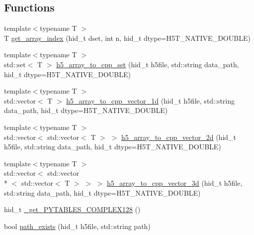 \subsection*{Functions}
\begin{DoxyCompactItemize}
\item 
{\footnotesize template$<$typename T $>$ }\\T \hyperlink{namespaceh5wrap_aa1fe2dffc1fcbde11e7ceaf3fcc57cfd}{get\+\_\+array\+\_\+index} (hid\+\_\+t dset, int n, hid\+\_\+t dtype=H5\+T\+\_\+\+N\+A\+T\+I\+V\+E\+\_\+\+D\+O\+U\+B\+L\+E)
\item 
{\footnotesize template$<$typename T $>$ }\\std\+::set$<$ T $>$ \hyperlink{namespaceh5wrap_ab8c97f180ec4885c15b275a41447912f}{h5\+\_\+array\+\_\+to\+\_\+cpp\+\_\+set} (hid\+\_\+t h5file, std\+::string data\+\_\+path, hid\+\_\+t dtype=H5\+T\+\_\+\+N\+A\+T\+I\+V\+E\+\_\+\+D\+O\+U\+B\+L\+E)
\item 
{\footnotesize template$<$typename T $>$ }\\std\+::vector$<$ T $>$ \hyperlink{namespaceh5wrap_ab927484b5e446d3325d8fc88b00f3e85}{h5\+\_\+array\+\_\+to\+\_\+cpp\+\_\+vector\+\_\+1d} (hid\+\_\+t h5file, std\+::string data\+\_\+path, hid\+\_\+t dtype=H5\+T\+\_\+\+N\+A\+T\+I\+V\+E\+\_\+\+D\+O\+U\+B\+L\+E)
\item 
{\footnotesize template$<$typename T $>$ }\\std\+::vector$<$ std\+::vector$<$ T $>$ $>$ \hyperlink{namespaceh5wrap_a0cc2fdb859631d95b9fe1dd85954f359}{h5\+\_\+array\+\_\+to\+\_\+cpp\+\_\+vector\+\_\+2d} (hid\+\_\+t h5file, std\+::string data\+\_\+path, hid\+\_\+t dtype=H5\+T\+\_\+\+N\+A\+T\+I\+V\+E\+\_\+\+D\+O\+U\+B\+L\+E)
\item 
{\footnotesize template$<$typename T $>$ }\\std\+::vector$<$ std\+::vector\\*
$<$ std\+::vector$<$ T $>$ $>$ $>$ \hyperlink{namespaceh5wrap_a30f0c9d34b6e369db5807362b8e1c1be}{h5\+\_\+array\+\_\+to\+\_\+cpp\+\_\+vector\+\_\+3d} (hid\+\_\+t h5file, std\+::string data\+\_\+path, hid\+\_\+t dtype=H5\+T\+\_\+\+N\+A\+T\+I\+V\+E\+\_\+\+D\+O\+U\+B\+L\+E)
\item 
hid\+\_\+t \hyperlink{namespaceh5wrap_a2ddc38d8445aba6996a31fc0dde6b7bf}{\+\_\+get\+\_\+\+P\+Y\+T\+A\+B\+L\+E\+S\+\_\+\+C\+O\+M\+P\+L\+E\+X128} ()
\item 
bool \hyperlink{namespaceh5wrap_ae8e8e2bdbaffb31ee8066260d3c68518}{path\+\_\+exists} (hid\+\_\+t h5file, std\+::string path)
\end{DoxyCompactItemize}



